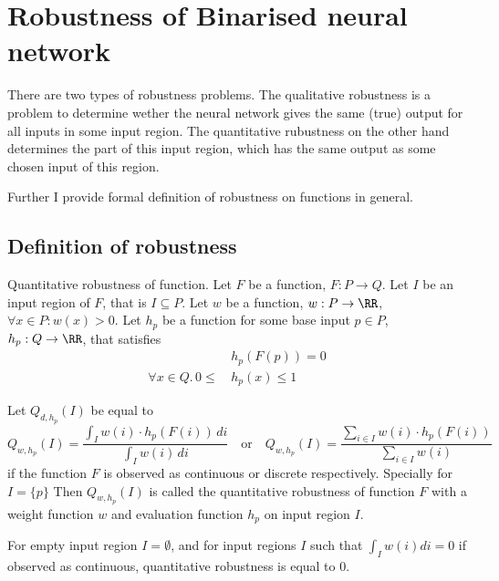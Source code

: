 \section{Robustness of Binarised neural network}

There are two types of robustness problems. The qualitative robustness
is a problem to determine wether the neural network gives the same (true)
output for all inputs in some input region. The quantitative rubustness
on the other hand determines the part of this input region, which has
the same output as some chosen input of this region.

Further I provide formal definition of robustness on functions in general.

\subsection{Definition of robustness}

\begin{definition}{Quantitative robustness of function.}
    Let $F$ be a function, $F: P \to Q$.
    Let $I$ be an input region of $F$, that is $I \subseteq P$.
    Let $w$ be a function, $w: P\to \RR$, $\forall x\in P: w(x) > 0$.
    Let $h_p$ be a function for some base input $p\in P$, $h_p: Q\to \RR$, that satisfies
    \begin{equation*}\begin{split}
        & h_p(F(p)) = 0 \\
        \forall x\in Q .\, 0 \leq \, & h_p(x) \leq 1 
    \end{split}\end{equation*}

    \noindent
    Let $Q_{d, h_p}(I)$ be equal to
    \begin{equation*}
        Q_{w, h_p}(I) = \frac{\int_I w(i)\cdot h_p(F(i)) \, di}{\int_I w(i) \, di}
        \hspace{1em} \text{or} \hspace{1em}
        Q_{w, h_p}(I) = \frac{\sum_{i\in I} w(i)\cdot h_p(F(i))}{\sum_{i\in I} w(i)}
    \end{equation*}
    if the function $F$ is observed as continuous or discrete respectively.
    Specially for $I=\{p\}$
    Then $Q_{w, h_p}(I)$ is called the quantitative robustness of function $F$
    with a weight function $w$ and evaluation function $h_p$ on input region $I$.

    For empty input region $I = \emptyset$,
    and for input regions $I$ such that $\int_I w(i) di = 0$ if observed as continuous,
    quantitative robustness is equal to $0$.
\end{definition}

